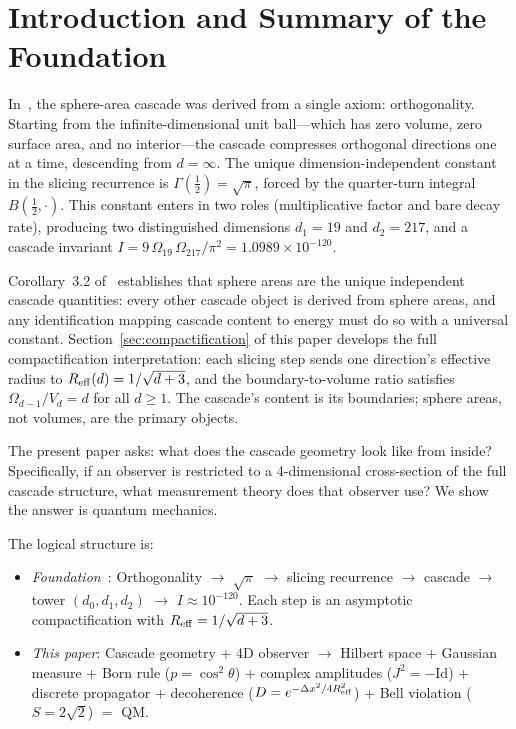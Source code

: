 \documentclass[12pt,a4paper]{article}
\begin{document}
\tableofcontents
\newpage

\section{Introduction and Summary of the Foundation}\label{sec:introduction-and-summary-of-the-foundati}

In~\cite{part0}, the sphere-area cascade was derived from a single axiom: orthogonality.
Starting from the infinite-dimensional unit ball---which has zero volume, zero surface area,
and no interior---the cascade compresses orthogonal directions one at a time, descending
from $d=\infty$. The unique dimension-independent constant in the slicing recurrence is
$\Gamma(\tfrac{1}{2})=\sqrt{\pi}$, forced by the quarter-turn integral $B(\tfrac{1}{2},\cdot)$.
This constant enters in two roles (multiplicative factor and bare decay rate), producing two
distinguished dimensions $d_1=19$ and $d_2=217$, and a cascade invariant
$I=9\,\Omega_{19}\,\Omega_{217}/\pi^2=1.0989\times 10^{-120}$.

Corollary~3.2 of~\cite{part0} establishes that sphere areas are the unique independent
cascade quantities: every other cascade object is derived from sphere areas, and any
identification mapping cascade content to energy must do so with a universal constant.
Section~\ref{sec:compactification} of this paper develops the full compactification
interpretation: each slicing step sends one direction's effective radius to
$R_{\rm eff}(d)=1/\sqrt{d+3}$, and the boundary-to-volume ratio satisfies
$\Omega_{d-1}/V_d=d$ for all $d\geq 1$. The cascade's content is its boundaries; sphere
areas, not volumes, are the primary objects.

The present paper asks: what does the cascade geometry look like from inside? Specifically,
if an observer is restricted to a 4-dimensional cross-section of the full cascade structure,
what measurement theory does that observer use? We show the answer is quantum mechanics.

The logical structure is:
\begin{itemize}
\item \emph{Foundation~\cite{part0}}: Orthogonality $\to$ $\sqrt{\pi}$ $\to$ slicing
recurrence $\to$ cascade $\to$ tower $(d_0,d_1,d_2)$ $\to$ $I\approx 10^{-120}$. Each step
is an asymptotic compactification with $R_{\rm eff}=1/\sqrt{d+3}$.
\item \emph{This paper}: Cascade geometry + 4D observer $\to$ Hilbert space + Gaussian
measure + Born rule ($p=\cos^2\theta$) + complex amplitudes ($J^2=-\mathrm{Id}$) +
discrete propagator + decoherence ($D=e^{-\Delta x^2/4R_{\rm eff}^2}$) + Bell violation
($S=2\sqrt{2}$) $=$ QM.
\end{itemize}
\end{document}
